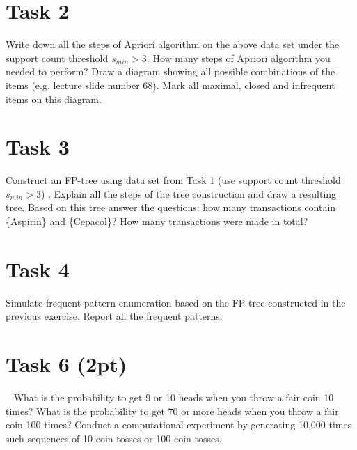 \documentclass{article}
\begin{document}
\section*{Task 2}
Write down all the steps of Apriori algorithm on the above data set under the support count  threshold $s_{min} > 3$. How many steps of Apriori algorithm you needed to perform? Draw a diagram showing all possible combinations of the items (e.g. lecture slide number 68). Mark all maximal, closed and infrequent items on this diagram.

\section*{Task 3}
Construct an FP-tree using data set from Task 1 (use support count  threshold $s_{min} > 3$) . Explain all the steps of the tree construction and draw a resulting tree. Based on this tree answer the questions: how many transactions contain \{Aspirin\} and \{Cepacol\}? How many transactions were made in total?

\section*{Task 4}
Simulate frequent pattern enumeration based on the FP-tree constructed in the previous exercise. Report all the frequent patterns. 


\section*{Task 6 (2pt)}\
What is the probability to get 9 or 10 heads when you throw a fair coin 10 times? What is the probability to get 70 or more heads when you throw a fair coin 100 times? Conduct a computational experiment by generating 10,000 times such sequences of 10 coin tosses or 100 coin tosses.
\end{document}

